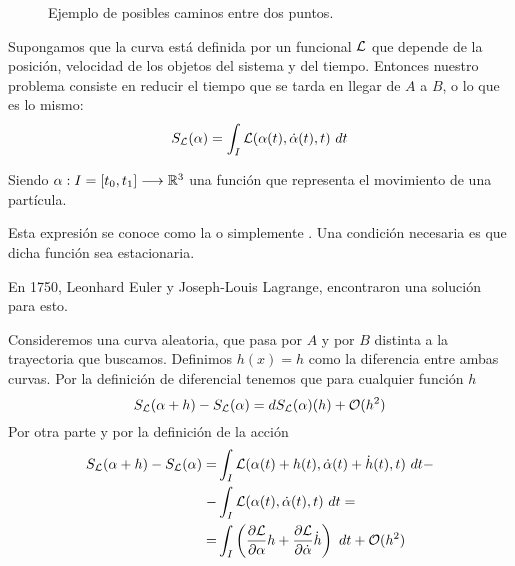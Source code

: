 \begin{figure}[H]
	\centering
	\caption{Ejemplo de posibles caminos entre dos puntos.}\label{pic:braquistocrona}
\end{figure}

Supongamos que la curva está definida por un funcional $\mathcal{L}$ que depende de la posición, velocidad de los objetos del sistema y del tiempo. Entonces nuestro problema consiste en reducir el tiempo que se tarda en llegar de $A$ a $B$, o lo que es lo mismo:
\begin{equation}
	\label{eq:accion}
	S_{\mathcal{L}}(\alpha) = \int_{I}\mathcal{L}(\alpha(t), \dot{\alpha}(t), t)\ dt
\end{equation}

Siendo $\alpha:I=[t_0, t_1]\longrightarrow \mathbb{R}^3$ una función que representa el movimiento de una partícula.

Esta expresión se conoce como la  o simplemente . Una condición necesaria es que dicha función sea estacionaria.

En 1750, Leonhard Euler y Joseph-Louis Lagrange, encontraron una solución para esto.

Consideremos una curva aleatoria, que pasa por $A$ y por $B$ distinta a la trayectoria que buscamos. Definimos $h(x) = h$ como la diferencia entre ambas curvas. Por la definición de diferencial tenemos que para cualquier función $h$
\begin{equation*}
	S_{\mathcal{L}}(\alpha + h) -  S_{\mathcal{L}}(\alpha) = dS_{\mathcal{L}}(\alpha)(h) +\mathcal{O}(h^2)
\end{equation*}
Por otra parte y por la definición de la acción
\begin{equation*}
	\begin{split}
		S_{\mathcal{L}}(\alpha + h) -  S_{\mathcal{L}}(\alpha) = & \int_{I}\mathcal{L}(\alpha(t)+h(t), \dot{\alpha}(t)+\dot{h}(t), t)\ dt - \\
		- & \int_{I}\mathcal{L}(\alpha(t), \dot{\alpha}(t), t)\ dt =\\
		=& \int_{I}\left( \frac{\partial \mathcal{L}}{\partial\alpha}h+\frac{\partial \mathcal{L}}{\partial\dot{\alpha}}\dot{h}\right)\ dt+\mathcal{O}(h^2)
	\end{split}
\end{equation*}

